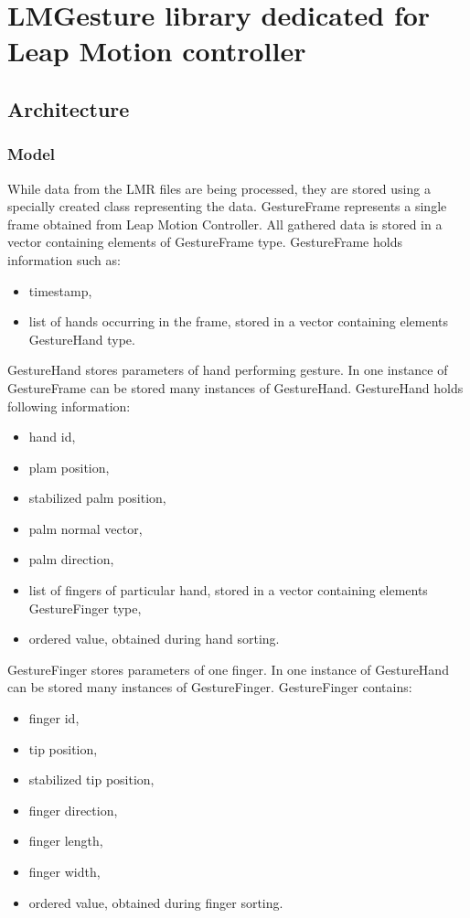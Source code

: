 \chapter{LMGesture library dedicated for Leap Motion controller}

\section{Architecture}

\subsection{Model}

While data from the LMR files are being processed, they are stored using a specially created class representing the data. GestureFrame represents a single frame obtained from Leap Motion Controller. All gathered data is stored in a vector containing elements of GestureFrame type. GestureFrame holds information such as:

\begin{itemize}
\item timestamp,
\item list of hands occurring in the frame, stored in a vector containing elements GestureHand type.
\end{itemize}

GestureHand stores parameters of hand performing gesture. In one instance of GestureFrame can be stored many instances of GestureHand. GestureHand holds following information:
\begin{itemize}
\item hand id,
\item plam position,
\item stabilized palm position,
\item palm normal vector,
\item palm direction,
\item list of fingers of particular hand, stored in a vector containing elements GestureFinger type,
\item ordered value, obtained during hand sorting.
\end{itemize}

GestureFinger stores parameters of one finger. In one instance of GestureHand can be stored many instances of GestureFinger. GestureFinger contains:
\begin{itemize}
\item finger id,
\item tip position,
\item stabilized tip position,
\item finger direction,
\item finger length,
\item finger width,
\item ordered value, obtained during finger sorting.
\end{itemize}

